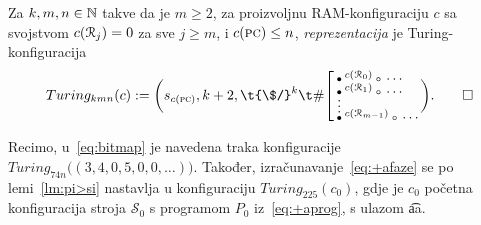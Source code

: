 \begin{definicija}
Za $k,m,n\in{\mathbb N}$ takve da je $m\ge 2$, za proizvoljnu RAM-konfiguraciju $c$ sa svojstvom $c(\mathcal R_{j})=0$ za sve $j\ge m$, i $c(\textsc{pc})\le n$, \emph{reprezentacija} je Turing-konfiguracija
\begin{equation}
Turing_{kmn}(c):=\biggl(s_{c(\textsc{pc})},k+2,\t{\$/}^k\t\#\!\left[\begin{array}{@{}l@{}}
\renewcommand{\arraystretch}{0.1}
\text\textbullet^{c(\reg0)}\text\textopenbullet\dotsm\\
\text\textbullet^{c(\reg1)}\text\textopenbullet\dotsm
\MTFlushSpaceBelow
\vdotswithin{\text\textbullet}
\MTFlushSpaceBelow
\text\textbullet^{c(\reg{m-1})}\text\textopenbullet\dotsm
\end{array}\right.\biggr)\text.\qedhere
\end{equation}
\end{definicija}

Recimo, u~\eqref{eq:bitmap} je navedena traka konfiguracije $Turing_{74n}\bigl((3,4,0,5,0,0,\dotsc)\bigr)$. Također, izračunavanje~\eqref{eq:+afaze} se po lemi~\ref{lm:pi>si} nastavlja u konfiguraciju $Turing_{225}(c_0)$, gdje je $c_0$ početna konfiguracija stroja $\mathcal S_0$ s programom $P_0$ iz~\eqref{eq:+aprog}, s ulazom \t{aa}.

